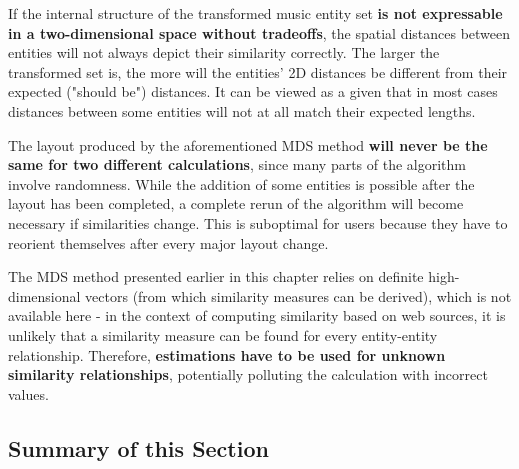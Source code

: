 If the internal structure of the transformed music entity set \textbf{is not expressable in a two-dimensional space without tradeoffs}, the spatial distances between entities will not always depict their similarity correctly. The larger the transformed set is, the more will the entities' 2D distances be different from their expected ("should be") distances. It can be viewed as a given that in most cases distances between some entities will not at all match their expected lengths.

The layout produced by the aforementioned MDS method \textbf{will never be the same for two different calculations}, since many parts of the algorithm involve randomness. While the addition of some entities is possible after the layout has been completed, a complete rerun of the algorithm will become necessary if similarities change. This is suboptimal for users because they have to reorient themselves after every major layout change.

The MDS method presented earlier in this chapter relies on definite high-dimensional vectors (from which similarity measures can be derived), which is not available here - in the context of computing similarity based on web sources, it is unlikely that a similarity measure can be found for every entity-entity relationship. Therefore, \textbf{estimations have to be used for unknown similarity relationships}, potentially polluting the calculation with incorrect values.

\subsection{Summary of this Section}